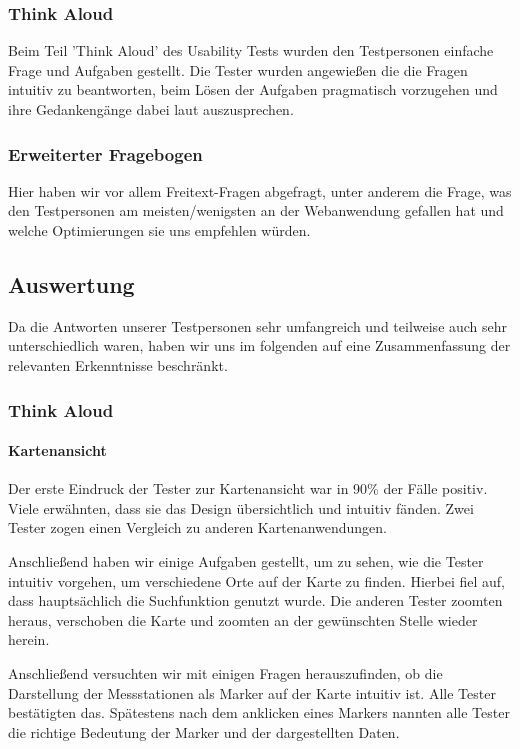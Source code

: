     \subsubsection*{Think Aloud}
      Beim Teil 'Think Aloud' des Usability Tests wurden den Testpersonen einfache Frage und Aufgaben gestellt. Die Tester wurden angewießen die die Fragen intuitiv zu beantworten, beim Lösen der Aufgaben pragmatisch vorzugehen und ihre Gedankengänge dabei laut auszusprechen.
    
    \subsubsection*{Erweiterter Fragebogen}
      Hier haben wir vor allem Freitext-Fragen abgefragt, unter anderem die Frage, was den Testpersonen am meisten/wenigsten an der Webanwendung gefallen hat und welche Optimierungen sie uns empfehlen würden.

  \subsection{Auswertung}
    Da die Antworten unserer Testpersonen sehr umfangreich und teilweise auch sehr unterschiedlich waren, haben wir uns im folgenden auf eine Zusammenfassung der relevanten Erkenntnisse beschränkt.

    \subsubsection{Think Aloud}
      \paragraph{Kartenansicht}
        Der erste Eindruck der Tester zur Kartenansicht war in 90\% der Fälle positiv. Viele erwähnten, dass sie das Design übersichtlich und intuitiv fänden. Zwei Tester zogen einen Vergleich zu anderen Kartenanwendungen.

        Anschließend haben wir einige Aufgaben gestellt, um zu sehen, wie die Tester intuitiv vorgehen, um verschiedene Orte auf der Karte zu finden. Hierbei fiel auf, dass hauptsächlich die Suchfunktion genutzt wurde. Die anderen Tester zoomten heraus, verschoben die Karte und zoomten an der gewünschten Stelle wieder herein.

        Anschließend versuchten wir mit einigen Fragen herauszufinden, ob die Darstellung der Messstationen als Marker auf der Karte intuitiv ist. Alle Tester bestätigten das. Spätestens nach dem anklicken eines Markers nannten alle Tester die richtige Bedeutung der Marker und der dargestellten Daten.

